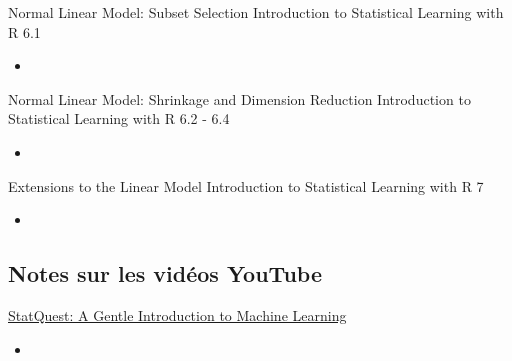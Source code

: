 \begin{CHPT_SUMM_AUTO_NUMB}[label = {L.-54}]{Normal Linear Model: Subset Selection}
Introduction to Statistical Learning with R 6.1
	\begin{itemize}
		\item	
	\end{itemize}
\end{CHPT_SUMM_AUTO_NUMB}

\begin{CHPT_SUMM_AUTO_NUMB}[label = {L.-55}]{Normal Linear Model: Shrinkage and Dimension Reduction}
Introduction to Statistical Learning with R 6.2 - 6.4
	\begin{itemize}
		\item	
	\end{itemize}
\end{CHPT_SUMM_AUTO_NUMB}

\begin{CHPT_SUMM_AUTO_NUMB}[label = {L.-56}]{Extensions to the Linear Model}
Introduction to Statistical Learning with R 7
	\begin{itemize}
		\item	
	\end{itemize}
\end{CHPT_SUMM_AUTO_NUMB}

\subsection{Notes sur les vidéos YouTube}

\begin{YTB_SUMM}[label = {SQ-BASICS-ML-INTRO}]{\href{https://www.youtube.com/watch?v=Gv9_4yMHFhI&list=PLblh5JKOoLUICTaGLRoHQDuF_7q2GfuJF&index=2&t=0s}{StatQuest: A Gentle Introduction to Machine Learning}}
\begin{itemize}
	\item	
\end{itemize}
\end{YTB_SUMM}